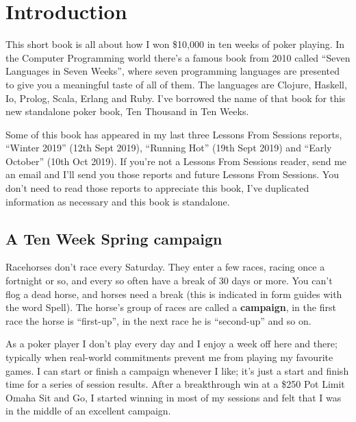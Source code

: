 \chapter{Introduction}


This short book is all about how I won \$10,000 in ten weeks of poker
playing. In the Computer Programming world there's a famous book from
2010 called ``Seven Languages in Seven Weeks'', where seven
programming languages are presented to give you a meaningful taste of
all of them. The languages are Clojure, Haskell, Io, Prolog, Scala,
Erlang and Ruby. I've borrowed the name of that book for this new
standalone poker book, Ten Thousand in Ten Weeks.

Some of this book has appeared in my last three Lessons From Sessions
reports, ``Winter 2019'' (12th Sept 2019), ``Running Hot'' (19th Sept
2019) and ``Early October'' (10th Oct 2019). If you're not a Lessons
From Sessions reader, send me an email and I'll send you those reports
and future Lessons From Sessions. You don't need to read those reports
to appreciate this book, I've duplicated information as necessary and
this book is standalone.

\section*{A Ten Week Spring campaign}

Racehorses don't race every Saturday. They enter a few races, racing
once a fortnight or so, and every so often have a break of 30 days or
more. You can't flog a dead horse, and horses need a break (this is
indicated in form guides with the word Spell). The horse's group of
races are called a \textbf{campaign}, in the first race the horse is
``first-up'', in the next race he is ``second-up'' and so on.

As a poker player I don't play every day and I enjoy a week off here
and there; typically when real-world commitments prevent me from
playing my favourite games. I can start or finish a campaign whenever
I like; it's just a start and finish time for a series of session
results. After a breakthrough win at a \$250 Pot Limit Omaha Sit and
Go, I started winning in most of my sessions and felt that I was in
the middle of an excellent campaign.

